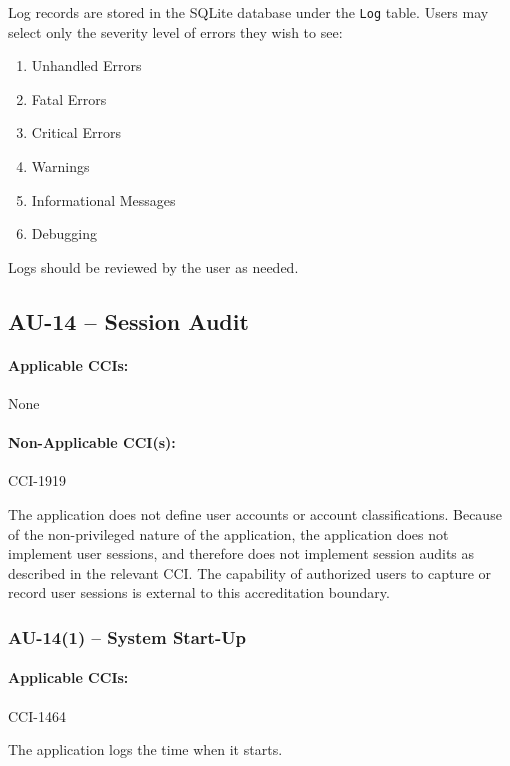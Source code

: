 \documentclass[letterpaper, 10pt, twoside]{article}
\begin{document}
Log records are stored in the SQLite database under the \texttt{Log} table. Users may select only the severity level of errors they wish to see:
\begin{enumerate}
	\item Unhandled Errors
	\item Fatal Errors
	\item Critical Errors
	\item Warnings
	\item Informational Messages
	\item Debugging
\end{enumerate}

Logs should be reviewed by the user as needed.

\subsection{AU-14 -- Session Audit}

\paragraph{Applicable CCIs:} None

\paragraph{Non-Applicable CCI(s):} CCI-1919

The application does not define user accounts or account classifications. Because of the non-privileged nature of the application, the application does not implement user sessions, and therefore does not implement session audits as described in the relevant CCI. The capability of authorized users to capture or record user sessions is external to this accreditation boundary.

\subsubsection{AU-14(1) -- System Start-Up}

\paragraph{Applicable CCIs:} CCI-1464

The application logs the time when it starts.

\clearpage
\printbibliography
\end{document}
